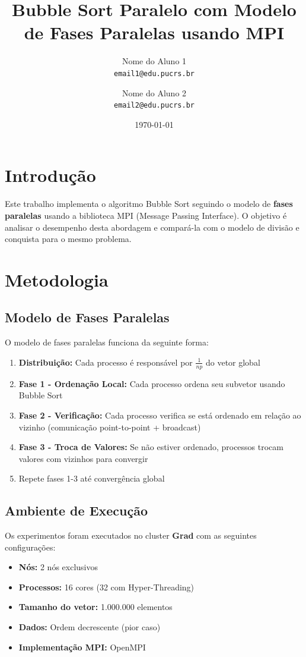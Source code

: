 \documentclass[10pt,twocolumn]{article}
\title{\textbf{Bubble Sort Paralelo com Modelo de Fases Paralelas usando MPI}}
\author{
    Nome do Aluno 1 \\
    \texttt{email1@edu.pucrs.br}
    \and
    Nome do Aluno 2 \\
    \texttt{email2@edu.pucrs.br}
}
\date{\today}
\begin{document}
\maketitle

\section{Introdução}

Este trabalho implementa o algoritmo Bubble Sort seguindo o modelo de \textbf{fases paralelas} usando a biblioteca MPI (Message Passing Interface). O objetivo é analisar o desempenho desta abordagem e compará-la com o modelo de divisão e conquista para o mesmo problema.

\section{Metodologia}

\subsection{Modelo de Fases Paralelas}

O modelo de fases paralelas funciona da seguinte forma:

\begin{enumerate}
    \item \textbf{Distribuição:} Cada processo é responsável por $\frac{1}{np}$ do vetor global
    \item \textbf{Fase 1 - Ordenação Local:} Cada processo ordena seu subvetor usando Bubble Sort
    \item \textbf{Fase 2 - Verificação:} Cada processo verifica se está ordenado em relação ao vizinho (comunicação point-to-point + broadcast)
    \item \textbf{Fase 3 - Troca de Valores:} Se não estiver ordenado, processos trocam valores com vizinhos para convergir
    \item Repete fases 1-3 até convergência global
\end{enumerate}

\subsection{Ambiente de Execução}

Os experimentos foram executados no cluster \textbf{Grad} com as seguintes configurações:

\begin{itemize}
    \item \textbf{Nós:} 2 nós exclusivos
    \item \textbf{Processos:} 16 cores (32 com Hyper-Threading)
    \item \textbf{Tamanho do vetor:} 1.000.000 elementos
    \item \textbf{Dados:} Ordem decrescente (pior caso)
    \item \textbf{Implementação MPI:} OpenMPI
\end{itemize}
\end{document}
